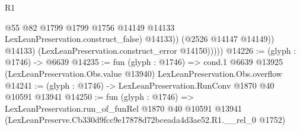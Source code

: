 \begin{lexlean}{R1}
\begin{coremodule}
                      @55
                      @82
                      @1799
                      @1799
                      @1756
                      @14149
                      @14133
                      LexLeanPreservation.construct_false)
                    @14133))
                (@2526 @14147 @14149))
              @14133)
            (LexLeanPreservation.construct_error @14150)))))
@14226 := (glyph : @1746) -> @6639
@14235 := fun (glyph : @1746) =>
  cond.{1} @6639 @13925 (LexLeanPreservation.Obs.value @13940) LexLeanPreservation.Obs.overflow
@14241 := (glyph : @1746) -> LexLeanPreservation.RunConv @1870 @40 @10591 @13941
@14250 := fun (glyph : @1746) =>
  LexLeanPreservation.run_of_funRel
    @1870
    @40
    @10591
    @13941
    (LexLeanPreserve.Cb330d9fcc9e17878d72bceada4d3ae52.R1.__rel_0 @1752)
\end{coremodule}
\end{lexlean}
